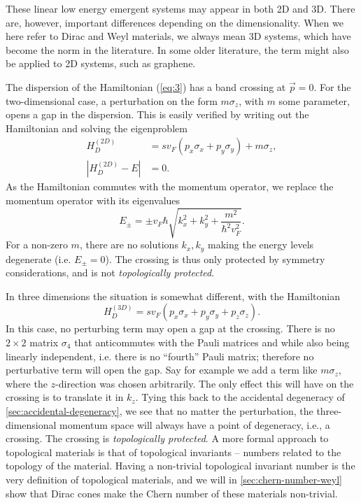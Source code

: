 These linear low energy emergent systems may appear in both 2D and 3D.
There are, however, important differences depending on the dimensionality.
When we here refer to Dirac and Weyl materials, we always mean 3D systems, which have become the norm in the literature.
In some older literature, the term might also be applied to 2D systems, such as graphene.

\label{sec:stability-of-gap}
The dispersion of the Hamiltonian (\ref{eq:3}) has a band crossing at  $\vec{p} = 0$.
For the two-dimensional case, a perturbation on the form $m \sigma_z$, with $m$ some parameter, opens a gap in the dispersion.
This is easily verified by writing out the Hamiltonian and solving the eigenproblem
\begin{align}
  H_D^{(2D)} &= s v_{F} (p_x \sigma_x + p_y \sigma_y) + m \sigma_z,\\
  \left|
  H_D^{(2D)} - E
  \right| &= 0.
\end{align}
As the Hamiltonian commutes with the momentum operator, we replace the momentum operator with its eigenvalues
\begin{equation}
E_{\pm} = \pm v_F \hbar \sqrt{k_x^2 + k_y^2 + \frac{m^2}{\hbar ^2 v_{F}^2}}.
\end{equation}
For a non-zero \( m \), there are no solutions $k_x, k_y$ making the energy levels degenerate (i.e. \( E_{\pm} = 0 \)).
The crossing is thus only protected by symmetry considerations, and is not \emph{topologically protected}.


In three dimensions the situation is somewhat different, with the Hamiltonian  
\begin{equation}
  H_D^{(3D)} = s v_F ( p_x \sigma_x + p_y \sigma_y + p_z \sigma_z).
\end{equation}
In this case, no perturbing term may open a gap at the crossing.
There is no $2\times 2$ matrix $\sigma_4$ that anticommutes with the Pauli matrices and while also being linearly independent, i.e. there is no ``fourth'' Pauli matrix;
therefore no perturbative term will open the gap.
Say for example we add a term like $m \sigma_z$, where the $z$-direction was chosen arbitrarily.
The only effect this will have on the crossing is to translate it in $k_z$.
Tying this back to the accidental degeneracy of \cref{sec:accidental-degeneracy}, we see that no matter the perturbation, the three-dimensional momentum space will always have a point of degeneracy, i.e., a crossing.
The crossing is \emph{topologically protected}.
A more formal approach to topological materials is that of topological invariants -- numbers related to the topology of the material.
Having a non-trivial topological invariant number is the very definition of topological materials, and we will in \cref{sec:chern-number-weyl} show that Dirac cones make the Chern number of these materials non-trivial.


